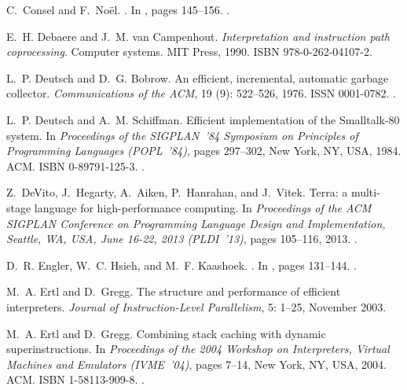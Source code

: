 \documentclass[preprint,10pt]{popl14conf}
\begin{document}
\begin{thebibliography}{46}
C.~Consel and F.~No{\"e}l.
.
\newblock In  \citet{popl'96}, pages 145--156.
\newblock {}.

E.~H. Debaere and J.~M. van Campenhout.
\newblock \emph{Interpretation and instruction path coprocessing}.
\newblock Computer systems. MIT Press, 1990.
\newblock ISBN 978-0-262-04107-2.

L.~P. Deutsch and D.~G. Bobrow.
\newblock An efficient, incremental, automatic garbage collector.
\newblock \emph{Communications of the {ACM}}, 19 (9):
  522--526, 1976.
\newblock ISSN 0001-0782.
\newblock {}.

L.~P. Deutsch and A.~M. Schiffman.
\newblock Efficient implementation of the {Smalltalk-80} system.
\newblock In \emph{Proceedings of the SIGPLAN~'84 Symposium on Principles of
  Programming Languages (POPL~'84)}, pages 297--302, New York, NY, USA, 1984.
  ACM.
\newblock ISBN 0-89791-125-3.
\newblock {}.

Z.~DeVito, J.~Hegarty, A.~Aiken, P.~Hanrahan, and J.~Vitek.
\newblock Terra: a multi-stage language for high-performance computing.
\newblock In \emph{Proceedings of the {ACM SIGPLAN Conference on Programming
  Language Design and Implementation}, Seattle, WA, USA, June 16-22, 2013
  (PLDI~'13)}, pages 105--116, 2013.
\newblock {}.

D.~R. Engler, W.~C. Hsieh, and M.~F. Kaashoek.
.
\newblock In  \citet{popl'96}, pages 131--144.
\newblock {}.

M.~A. Ertl and D.~Gregg.
\newblock The structure and performance of efficient interpreters.
\newblock \emph{Journal of Instruction-Level Parallelism}, 5: 1--25,
  November 2003.

M.~A. Ertl and D.~Gregg.
\newblock Combining stack caching with dynamic superinstructions.
\newblock In \emph{Proceedings of the 2004 Workshop on Interpreters, Virtual
  Machines and Emulators (IVME~'04)}, pages 7--14, New York, NY, USA, 2004.
  ACM.
\newblock ISBN 1-58113-909-8.
\newblock {}.


\end{thebibliography}
\end{document}
